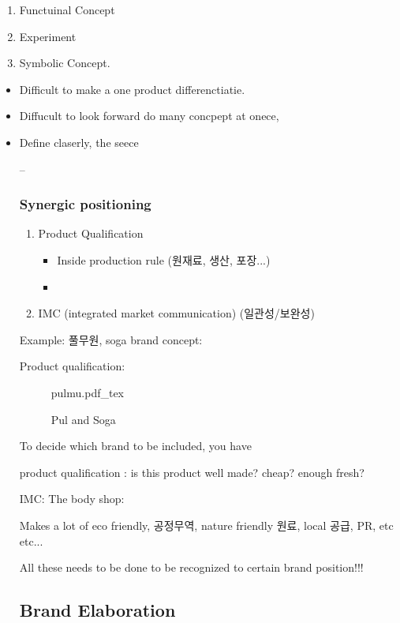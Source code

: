 \documentclass[12pt]{article}
\begin{document}
\begin{enumerate}
	\item Functuinal Concept
	\item Experiment
	\item Symbolic Concept.
\end{enumerate}
\begin{itemize}
	\item Difficult to make a one product differenctiatie.
	\item Diffucult to look forward do many concpept at onece,
	\item  Define claserly, the seece

--



\subsubsection{Synergic positioning}

\begin{enumerate}
	\item Product Qualification
	\begin{itemize}
		\item Inside production rule (원재료, 생산, 포장...)
		\item
	\end{itemize}
	\item IMC (integrated market communication) (일관성/보완성)


\end{enumerate}

Example:
풀무원, soga brand concept:

Product qualification:

\begin{figure}[H]
	\centering
	\def\svgwidth{\columnwidth}
	{pulmu.pdf_tex}
	\caption{Pul and Soga}
	\label{fig:pulmu}
\end{figure}

To decide which brand to be included, you have

product qualification : is this product well made? cheap? enough fresh?


IMC:
The body shop:

Makes a lot of eco friendly, 공정무역, nature friendly 원료, local 공급, PR, etc etc...

All these needs to be done to be recognized to certain brand position!!!


\subsection{Brand Elaboration}


\end{itemize}
\end{document}
